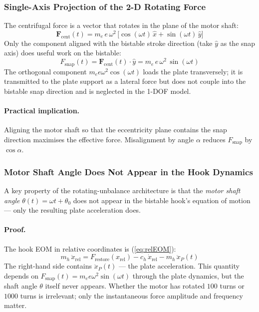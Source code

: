 \documentclass[11pt,letterpaper]{article}
\begin{document}
\subsubsection{Single-Axis Projection of the 2-D Rotating Force}
\label{sssec:projection}

The centrifugal force is a vector that rotates in the plane of the motor shaft:
\begin{equation}
  \mathbf{F}_{\mathrm{cent}}(t)
  = m_e\,e\,\omega^2\,\bigl[\cos(\omega t)\,\hat{x} + \sin(\omega t)\,\hat{y}\bigr]
  \label{eq:Fcent_2d}
\end{equation}
Only the component aligned with the bistable stroke direction (take $\hat{y}$
as the snap axis) does useful work on the bistable:
\begin{equation}
  F_{\mathrm{snap}}(t)
  = \mathbf{F}_{\mathrm{cent}}(t)\cdot\hat{y}
  = m_e\,e\,\omega^2\,\sin(\omega t)
  \label{eq:Fsnap_proj}
\end{equation}
The orthogonal component $m_e e \omega^2 \cos(\omega t)$ loads the plate
transversely; it is transmitted to the plate support as a lateral force but
does not couple into the bistable snap direction and is neglected in the
1-DOF model.

\paragraph{Practical implication.}
Aligning the motor shaft so that the eccentricity plane contains the snap
direction maximises the effective force.  Misalignment by angle $\alpha$
reduces $F_{\mathrm{snap}}$ by $\cos\alpha$.

\subsubsection{Motor Shaft Angle Does Not Appear in the Hook Dynamics}
\label{sssec:decoupling}

A key property of the rotating-unbalance architecture is that the
\emph{motor shaft angle} $\theta(t) = \omega t + \theta_0$ does not appear in
the bistable hook's equation of motion --- only the resulting plate
acceleration does.

\paragraph{Proof.}
The hook EOM in relative coordinates is (\cref{eq:relEOM}):
\begin{equation}
  m_h\,\ddot{x}_{\mathrm{rel}}
  = F_{\mathrm{restore}}(x_{\mathrm{rel}})
    - c_h\,\dot{x}_{\mathrm{rel}}
    - m_h\,\ddot{x}_P(t)
  \label{eq:hook_decoupled}
\end{equation}
The right-hand side contains $\ddot{x}_P(t)$ --- the plate acceleration.
This quantity depends on $F_{\mathrm{snap}}(t) = m_e e\omega^2 \sin(\omega t)$
through the plate dynamics, but the shaft angle $\theta$ itself never appears.
Whether the motor has rotated $100$ turns or $1000$ turns is irrelevant; only
the instantaneous force amplitude and frequency matter.
\end{document}
